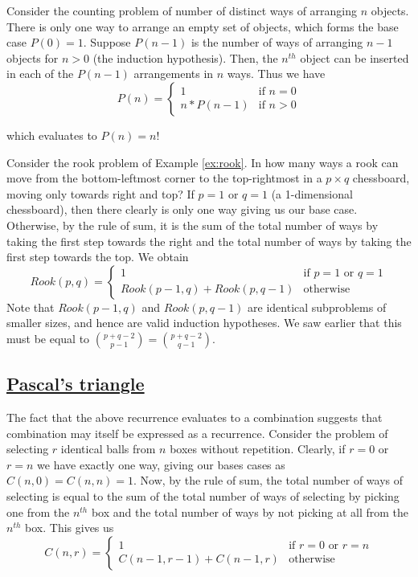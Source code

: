\begin{example}
Consider the counting problem of number of distinct ways of arranging $n$ objects. There is only one way to arrange an empty set of objects, which forms the base case $P(0) = 1$. Suppose $P(n-1)$ is the number of ways
of arranging $n-1$ objects for $n > 0$ (the induction hypothesis). Then, the $n^{th}$ object can be inserted in each of the $P(n-1)$ arrangements in $n$ ways. Thus we have
\[
P(n) = \left\{ 
            \begin{array}{ll}
            1 & \mbox{if $n = 0$} \\
            n * P(n-1)  & \mbox{if $n > 0$}
            \end{array}
           \right.
\]

which evaluates to $P(n) = n!$
\end{example}
\begin{example}
Consider the rook problem of Example \ref{ex:rook}. In how many ways a rook can move from the bottom-leftmost corner to the top-rightmost in a $p \times q$ chessboard, moving only towards right and top? If $p = 1$ or $q = 1$ (a 1-dimensional chessboard), then there clearly is only one way giving us our base case. Otherwise, by the rule of sum, it is the sum of the total number of ways by taking the first step towards the right and the total number of ways by taking the first step towards the top. We obtain
\[
Rook(p,q) = \left\{ 
            \begin{array}{ll}
            1 & \mbox{if $p = 1$ or $q = 1$} \\
             Rook(p-1,q) + Rook(p,q-1) & \mbox{otherwise}
            \end{array}
           \right.
\]
Note that $Rook(p-1,q)$ and $Rook(p,q-1)$ are identical subproblems of smaller sizes, and hence are valid induction hypotheses. We saw earlier that this must be equal to $\binom{p+q-2}{p-1} = \binom{p+q-2}{q-1}$.
\end{example}

\subsection{\href{https://mathworld.wolfram.com/PascalsTriangle.html}{Pascal's triangle}}
The fact that the above recurrence evaluates to a combination suggests that  combination may itself be expressed as a recurrence. Consider the problem of selecting $r$ identical balls from $n$ boxes without repetition. Clearly,
if $r=0$ or $r=n$ we have exactly one way, giving our bases cases as $C(n,0) = C(n,n) = 1$. Now, by the rule of sum, the total number of ways of selecting is equal to the sum of the total number of ways of selecting by picking one from the $n^{th}$ box and the total number of ways by not picking at all from the $n^{th}$ box. This gives us
\[
C(n,r) = \left\{ 
            \begin{array}{ll}
            1 & \mbox{if $r = 0$ or $r = n$} \\
             C(n-1,r-1) + C(n-1,r) & \mbox{otherwise}
            \end{array}
           \right.
\]

